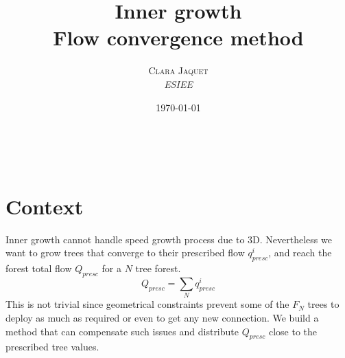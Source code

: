 \documentclass[a4paper, 11pt]{article} %
\title{\textbf{Inner growth }\\ %
Flow convergence method} %
\author{\textsc{Clara Jaquet} %
\\{\textit{ESIEE}}} %
\date{\today} %
\makeatletter
\renewcommand{\maketitle}{ %
\begin{flushright} %
{\LARGE\@title} %

\vspace{50pt} %

{\large\@author} %
\\\@date %

\vspace{40pt} %
\end{flushright}
}
\makeatother
\begin{document}
\maketitle %



%



\section*{Context}
Inner growth cannot handle speed growth process due to 3D.
Nevertheless we want to grow trees that converge to their prescribed flow $q_{presc}^i$, and reach the forest total flow $Q_{presc}$ for a $N$ tree forest. 
\begin{equation}
Q_{presc} = \sum\limits_N q_{presc}^i
\end{equation}
This is not trivial since geometrical constraints prevent some of the $F_N$ trees to deploy as much as required or even to get any new connection. We build a method that can compensate such issues and distribute $Q_{presc}$ close to the prescribed tree values. 


\end{document}
